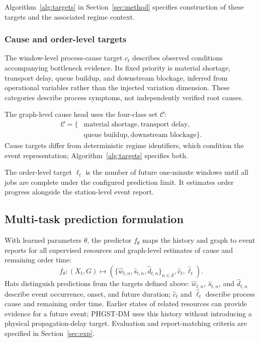 \documentclass[a4paper,fleqn]{cas-dc}
\begin{document}
Algorithm~\ref{alg:targets} in Section~\ref{sec:method} specifies construction of these targets and the associated regime context.


\subsubsection{Cause and order-level targets}

The window-level process-cause target $c_t$ describes observed conditions accompanying bottleneck evidence. Its fixed priority is material shortage, transport delay, queue buildup, and downstream blockage, inferred from operational variables rather than the injected variation dimension. These categories describe process symptoms, not independently verified root causes.

The graph-level cause head uses the four-class set $\mathcal{C}$:
\begin{equation}
\begin{aligned}
\mathcal{C}=\{&
\text{material shortage},\text{transport delay},\\
&\text{queue buildup},\text{downstream blockage}\}.
\end{aligned}
\end{equation}
Cause targets differ from deterministic regime identifiers, which condition the event representation; Algorithm~\ref{alg:targets} specifies both.

The order-level target $\ell_t$ is the number of future one-minute windows until all jobs are complete under the configured prediction limit. It estimates order progress alongside the station-level event report.

\subsection{Multi-task prediction formulation}

With learned parameters $\theta$, the predictor $f_{\theta}$ maps the history and graph to event reports for all supervised resources and graph-level estimates of cause and remaining order time:
\begin{equation}
f_{\theta}:(X_t,G)\longmapsto
\left(
\{\hat w_{t,n},\hat s_{t,n},\hat d_{t,n}\}_{n\in\mathcal{S}},
\hat c_t,\hat\ell_t
\right).
\end{equation}
Hats distinguish predictions from the targets defined above: $\hat w_{t,n}$, $\hat s_{t,n}$, and $\hat d_{t,n}$ describe event occurrence, onset, and future duration; $\hat c_t$ and $\hat\ell_t$ describe process cause and remaining order time. Earlier states of related resources can provide evidence for a future event; PHGST-DM uses this history without introducing a physical propagation-delay target. Evaluation and report-matching criteria are specified in Section~\ref{sec:exp}.
\end{document}
